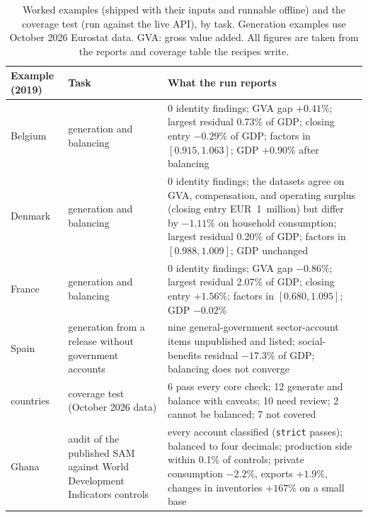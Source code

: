 \documentclass[11pt,a4paper]{article}
\begin{document}
\begin{table}[t]
\centering\small
\begin{tabularx}{\textwidth}{>{\raggedright\arraybackslash}p{}>{\raggedright\arraybackslash}p{}X}
\toprule
Example (2019) & Task & What the run reports \\
\midrule
Belgium & generation and balancing & 0 identity findings; GVA gap $+0.41\%$; largest residual 0.73\% of GDP; closing entry $-0.29\%$ of GDP; factors in $[0.915, 1.063]$; GDP $+0.90\%$ after balancing \\
Denmark & generation and balancing & 0 identity findings; the datasets agree on GVA, compensation, and operating surplus (closing entry EUR~1~million) but differ by $-1.11\%$ on household consumption; largest residual 0.20\% of GDP; factors in $[0.988, 1.009]$; GDP unchanged \\
France & generation and balancing & 0 identity findings; GVA gap $-0.86\%$; largest residual 2.07\% of GDP; closing entry $+1.56\%$; factors in $[0.680, 1.095]$; GDP $-0.02\%$ \\
Spain & generation from a release without government accounts & nine general-government sector-account items unpublished and listed; social-benefits residual $-17.3\%$ of GDP; balancing does not converge \\
37 countries & coverage test (October 2026 data) & 6 pass every core check; 12 generate and balance with caveats; 10 need review; 2 cannot be balanced; 7 not covered \\
Ghana & audit of the published SAM against World Development Indicators controls & every account classified (\texttt{strict} passes); balanced to four decimals; production side within 0.1\% of controls; private consumption $-2.2\%$, exports $+1.9\%$, changes in inventories $+167\%$ on a small base \\
\bottomrule
\end{tabularx}
\caption{Worked examples (shipped with their inputs and runnable offline)
and the coverage test (run against the live API), by task. Generation
examples use October 2026 Eurostat data. GVA:
gross value added. All figures are taken from the reports and coverage
table the recipes write.}
\label{tab:examples}
\end{table}
\end{document}
